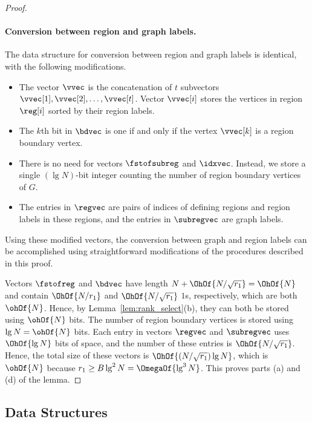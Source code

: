 {\begin{proof}
  \paragraph{Conversion between region and graph labels.}

  The data structure for conversion between region and graph labels is
  identical, with the following modifications.
  \begin{itemize}
  \item The vector $\vvec$ is the concatenation of $t$ subvectors
    $\vvec[1], \vvec[2], \dots, \vvec[t]$.
    Vector $\vvec[i]$ stores the vertices in region $\reg[i]$ sorted
    by their region labels.
  \item The $k$th bit in $\bdvec$ is one if and only if the vertex
    $\vvec[k]$ is a region boundary vertex.
  \item There is no need for vectors $\fstofsubreg$ and $\idxvec$.
    Instead, we store a single $(\lg N)$-bit integer counting the number
    of region boundary vertices of $G$.
  \item The entries in $\regvec$ are pairs of indices of defining
    regions and region labels in these regions, and the entries in
    $\subregvec$ are graph labels.
  \end{itemize}
  Using these modified vectors, the conversion between graph and region labels
  can be accomplished using straightforward modifications of the procedures
  described in this proof.

  Vectors $\fstofreg$ and $\bdvec$ have length
  $N + \OhOf{N / \sqrt{\regsz}} = \OhOf{N}$ and contain $\OhOf{N / \regsz}$ and
  $\OhOf{N / \sqrt{\regsz}}$ $1$s, respectively, which are both $\ohOf{N}$.
  Hence, by Lemma~\ref{lem:rank_select}(b), they can both be stored using
  $\ohOf{N}$ bits.
  The number of region boundary vertices is stored using $\lg N = \ohOf{N}$
  bits.
  Each entry in vectors $\regvec$ and $\subregvec$ uses $\OhOf{\lg N}$ bits
  of space, and the number of these entries is $\OhOf{N / \sqrt{\regsz}}$.
  Hence, the total size of these vectors is $\OhOf{(N / \sqrt{\regsz}) \lg N}$,
  which is $\ohOf{N}$ because $\regsz \ge B \lg^2 N = \OmegaOf{\lg^3 N}$.
  This proves parts (a) and (d) of the lemma.
\end{proof}

\subsection{Data Structures}\label{sec:datastructs}

}
